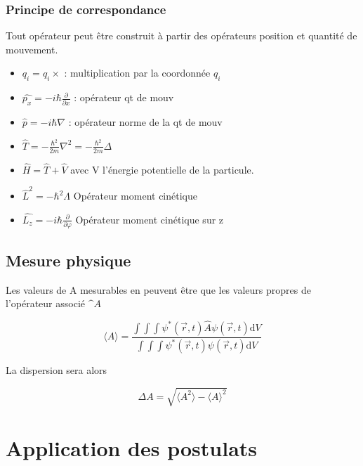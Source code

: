 \documentclass[french]{yLectureNote}
\renewcommand{\vec}{\overrightarrow}
\newcommand{\dd}{\mathrm{d}}
\newcommand{\fo}{\psi(\vec{r},t)}
\newcommand{\foe}{\psi^*(\vec{r},t)}
\newcommand{\hb}{\hbar}
\begin{document}
\subsubsection{Principe de correspondance}
\begin{theorem}
 Tout opérateur peut \^etre construit à partir des opérateurs position et quantité de mouvement.
\end{theorem}
\begin{definition}
\begin{itemize}
        \item \(\hat{q_i} = q_i \times\) : multiplication par la coordonnée \(q_i\)
        \item \(\hat{p_x} = -i\hbar \frac{\partial}{\partial x}\) : opérateur qt de mouv
        \item \(\hat{p} = -i\hbar \nabla\) : opérateur norme de la qt de mouv
        \item \(\hat{T} = - \frac{\hbar^2}{2m}\nabla^2 = - \frac{\hbar^2}{2m}\Delta\)
        \item \(\hat{H} = \hat{T} + \hat{V}\) avec V l'énergie potentielle de la particule.
        \item \(\hat{L}^2 = -\hb^2\Lambda\) Opérateur moment cinétique
        \item \(\hat{L_z} = -i\hb \frac{\partial}{\partial \varphi}\) Opérateur moment cinétique sur z
       \end{itemize}
\end{definition}
\subsection{Mesure physique}
\begin{theorem}
 Les valeurs de A mesurables en peuvent \^etre que les valeurs propres de l'opérateur associé \(\^A\)
\end{theorem}
\begin{proposition}
\label{prop1}
\[\langle A\rangle  = \frac{\int\int\int \foe\hat{A}\fo \dd V}{\int\int\int\foe \fo \dd V}\]
\end{proposition}
La dispersion sera alors
\begin{proposition}[Dispersion]
\[\Delta A = \sqrt{\langle A^2\rangle -\langle A\rangle ^2}\]
\end{proposition}
\section{Application des postulats}
\end{document}
